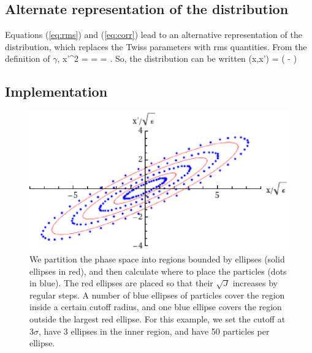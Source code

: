 \subsection{Alternate representation of the distribution}
Equations (\ref{eq:rms}) and (\ref{eq:corr}) lead to an alternative representation of the distribution, which replaces the Twiss parameters with rms quantities.
From the definition of $\gamma$, 
\Begineq
	\langle x'^2 \rangle = \varepsilon{} =  \quad \Rightarrow \quad \varepsilon = .
\Endeq
So, the distribution can be written
\Begineq
	\rho(x,x') =  \exp \left( - \right)
\Endeq

\subsection{Implementation}
\begin{figure}[htp]
	\centering \includegraphics[scale=0.75]{filledellipse.eps}
	\caption{We partition the phase space into regions bounded by ellipses (solid ellipses in red), and then calculate where to place the particles (dots in blue).  The red ellipses are placed so that their $\sqrt{J}$ increases by regular steps.  A number of blue ellipses of particles cover the region inside a certain cutoff radius, and one blue ellipse covers the region outside the largest red ellipse.  For this example, we set the cutoff at 3$\sigma$, have 3 ellipses in the inner region, and have 50 particles per ellipse.}
	\label{fig:finishedellipse}
\end{figure}

